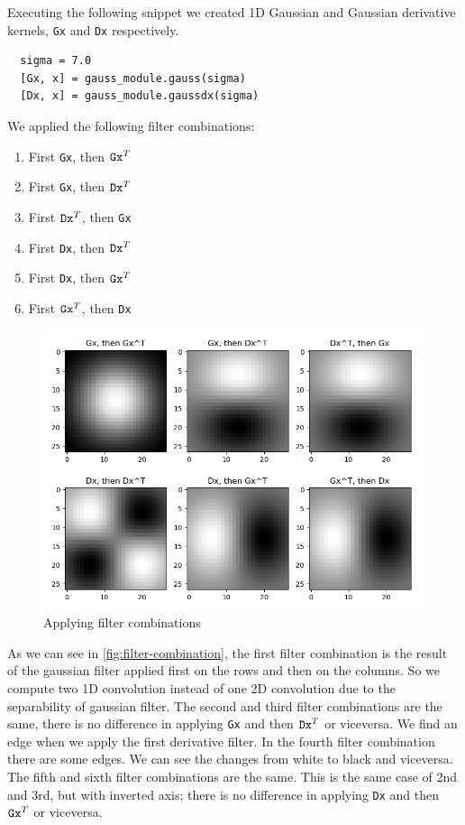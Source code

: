 \documentclass{article}
\begin{document}
\noindent
Executing the following snippet we created 1D Gaussian and Gaussian derivative kernels, \verb|Gx| and \verb|Dx| respectively.
\begin{verbatim}
  sigma = 7.0
  [Gx, x] = gauss_module.gauss(sigma)
  [Dx, x] = gauss_module.gaussdx(sigma)
\end{verbatim}
We applied the following filter combinations:
\begin{enumerate}
    \item First \verb|Gx|, then $ \verb|Gx|^T $
    \item First \verb|Gx|, then $ \verb|Dx|^T $
    \item First $ \verb|Dx|^T $, then \verb|Gx|
    \item First \verb|Dx|, then $ \verb|Dx|^T $
    \item First \verb|Dx|, then $ \verb|Gx|^T $
    \item First $ \verb|Gx|^T $, then \verb|Dx|
\end{enumerate}

\begin{figure}[ht]
    \centering
    \includegraphics[width=\textwidth]{images/Q1.d-F2.png}
    \caption{Applying filter combinations}
    \label{fig:filter-combination}
\end{figure}

\noindent
As we can see in \autoref{fig:filter-combination}, the first filter combination is the result of the gaussian filter applied first on the rows and then on the columns. So we compute two 1D convolution instead of one 2D convolution due to the separability of gaussian filter.
\newline
The second and third filter combinations are the same, there is no difference in applying \verb|Gx| and then $\verb|Dx|^T$ or viceversa. We find an edge when we apply the first derivative filter.
\newline
In the fourth filter combination there are some edges. We can see the changes from white to black and viceversa.
\newline
The fifth and sixth filter combinations are the same. This is the same case of 2nd and 3rd, but with inverted axis; there is no difference in applying \verb|Dx| and then $\verb|Gx|^T$ or viceversa.
\end{document}
